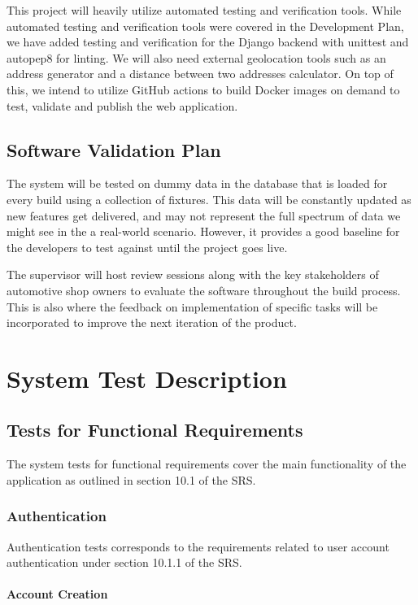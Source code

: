 \documentclass[12pt, titlepage]{article}
\begin{document}
This project will heavily utilize automated testing and verification tools. While automated testing and verification tools were covered in the Development Plan, we have added testing and verification for the Django backend with unittest and autopep8 for linting. We will also need external geolocation tools such as an address generator and a distance between two addresses calculator. On top of this, we intend to utilize GitHub actions to build Docker images on demand to test, validate and publish the web application.

\subsection{Software Validation Plan}

The system will be tested on dummy data in the database that is loaded for every build using a collection of fixtures. This data will be constantly updated as new features get delivered, and may not represent the full spectrum of data we might see in the a real-world scenario. However, it provides a good baseline for the developers to test against until the project goes live.

\noindent The supervisor will host review sessions along with the key stakeholders of automotive shop owners to evaluate the software throughout the build process. This is also where the feedback on implementation of specific tasks will be incorporated to improve the next iteration of the product.

\section{System Test Description}
	
\subsection{Tests for Functional Requirements}
The system tests for functional requirements cover the main functionality of the application as outlined in section 10.1 of the SRS.

\subsubsection{Authentication}
Authentication tests corresponds to the requirements related to user account authentication under section 10.1.1 of the SRS.
		
\paragraph{Account Creation}
\end{document}
